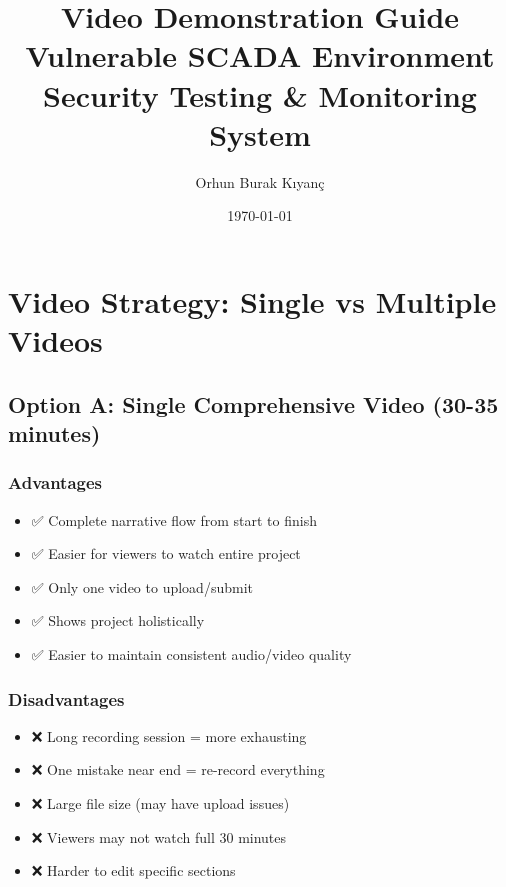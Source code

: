 \documentclass[12pt,a4paper]{article}
\title{\textbf{Video Demonstration Guide}\\
\large Vulnerable SCADA Environment\\
Security Testing \& Monitoring System}
\author{Orhun Burak Kıyanç}
\date{\today}
\begin{document}
\maketitle
\tableofcontents
\newpage

\section{Video Strategy: Single vs Multiple Videos}

\subsection{Option A: Single Comprehensive Video (30-35 minutes)}

\subsubsection{Advantages}
\begin{itemize}[leftmargin=*]
    \item ✅ Complete narrative flow from start to finish
    \item ✅ Easier for viewers to watch entire project
    \item ✅ Only one video to upload/submit
    \item ✅ Shows project holistically
    \item ✅ Easier to maintain consistent audio/video quality
\end{itemize}

\subsubsection{Disadvantages}
\begin{itemize}[leftmargin=*]
    \item ❌ Long recording session = more exhausting
    \item ❌ One mistake near end = re-record everything
    \item ❌ Large file size (may have upload issues)
    \item ❌ Viewers may not watch full 30 minutes
    \item ❌ Harder to edit specific sections
\end{itemize}
\end{document}
